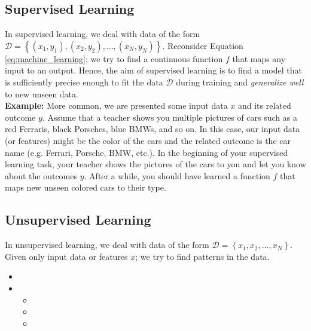 \subsection{Supervised Learning}
In supervised learning, we deal with data of the form $\mathcal{D} = \left\{ (x_1,y_1),(x_2,y_2), \ldots, (x_N,y_N) \right\}$. %
Reconsider Equation \ref{eq:machine_learning}; we try to find a continuous function $f$ that maps any input to an output. %
Hence, the aim of supervised learning is to find a model that is sufficiently precise enough to fit the data $\mathcal{D}$ during training and \emph{generalize well} to new unseen data. %
\\[2ex]%
\textbf{Example:} More common, we are presented some input data $x$ and its related outcome $y$. %
Assume that a teacher shows you multiple pictures of cars such as a red Ferraris, black Porsches, blue BMWs, and so on. %
In this case, our input data (or features) might be the color of the cars and the related outcome is the car name (e.g. Ferrari, Porsche, BMW, etc.). %
In the beginning of your supervised learning task, your teacher shows the pictures of the cars to you and let you know about the outcomes $y$. %
After a while, you should have learned a function $f$ that maps new unseen colored cars to their type. %
\subsection{Unsupervised Learning}
In unsupervised learning, we deal with data of the form $\mathcal{D} = \left\{ x_1,x_2, \ldots, x_N \right\}$. %
Given only input data or features $x$; we try to find patterns in the data. %

\begin{itemize}
	\item{}
	\item{}%
	\begin{itemize}
		\item{}
		\item{}
		\item{}
	\end{itemize}
\end{itemize}

